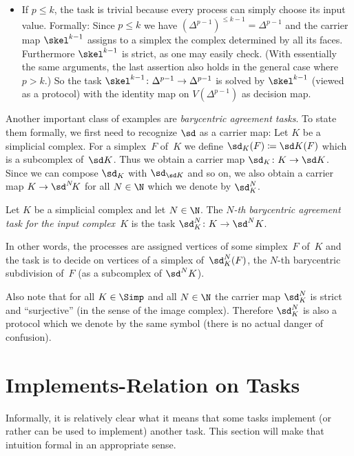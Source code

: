 \begin{thExample}
\begin{itemize}
        \item
            If $p\leq k$, the task is trivial because every process can simply
            choose its input value. Formally: Since $p\leq k$ we have
            $(\Delta^{p-1})^{\leq k-1} = \Delta^{p-1}$ and the carrier map
            $\skel^{k-1}$ assigns to a simplex the complex determined by all its
            faces. Furthermore $\skel^{k-1}$ is strict, as one may easily check.
            (With essentially the same arguments, the last assertion also holds
            in the general case where $p > k$.) So the task
            $\skel^{k-1}\colon\Delta^{p-1}\to\Delta^{p-1}$ is solved by
            $\skel^{k-1}$ (viewed as a protocol) with the identity map
            on $V(\Delta^{p-1})$ as decision map.
    \end{itemize}
\end{thExample}

Another important class of examples are \emph{barycentric agreement tasks}. To
state them formally, we first need to recognize $\sd$ 
as a carrier map:
Let $K$ be a simplicial complex. For a simplex~$F$ of~$K$ we define
$\sd_K(F) \defeq \sd K(F)$ which is a subcomplex of~$\sd K$. Thus we
obtain a carrier map $\sd_K\colon K\to\sd K$. Since we can compose
$\sd_K$ with $\sd_{\sd K}$ and so on, we also obtain a carrier map
$K\to\sd^N\!K$ for all $N\in\N$ which we denote by $\sd_K^N$.

\begin{thExample}
    \label{ch2:barycentricagreement}
    Let $K$ be a simplicial complex and let $N\in\N$. The
    \emph{$N$-th barycentric agreement task for the input complex~$K$}
    is the task $\sd_K^N\colon K\to\sd^N K$.
    
    In other words, the processes are assigned vertices of some simplex~$F$
    of~$K$ and the task is to decide on vertices of a simplex
    of~$\sd_K^N(F)$, the $N$-th barycentric subdivision of~$F$
    (as a subcomplex of $\sd^N K$).
\end{thExample}

Also note that for all $K\in\Simp$ and all $N\in\N$ the carrier map
$\sd_K^N$ is strict and \enquote{surjective} (in the sense of the image
complex). Therefore $\sd_K^N$ is also a protocol which we denote by
the same symbol (there is no actual danger of confusion).


\section{Implements-Relation on Tasks}
Informally, it is relatively clear what it means that some tasks implement
(or rather can be used to implement) another task. This section will make
that intuition formal in an appropriate sense.

